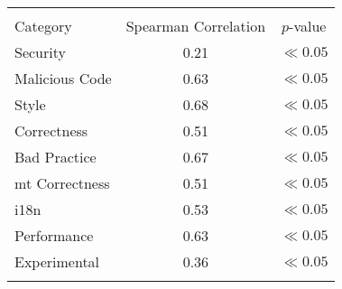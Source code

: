 
\begin{tabular}{lcc}
\hline \\
Category & Spearman Correlation & $p$-value \\ \hline 
Security & 0.21 & $\ll 0.05$\\
Malicious Code & 0.63 & $\ll 0.05$\\
Style & 0.68 & $\ll 0.05$\\
Correctness & 0.51 & $\ll 0.05$\\
Bad Practice & 0.67 & $\ll 0.05$\\
{\sc mt} Correctness & 0.51 & $\ll 0.05$\\
i18n & 0.53 & $\ll 0.05$\\
Performance & 0.63 & $\ll 0.05$\\
Experimental & 0.36 & $\ll 0.05$\\
\hline \\
\end{tabular}
